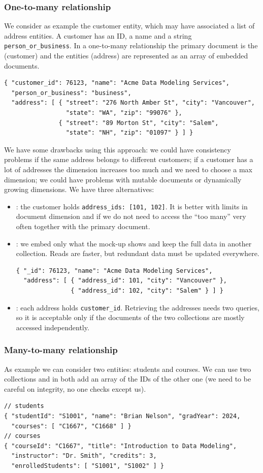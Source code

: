 \subsubsection{One-to-many relationship}
We consider as example the customer entity, which may have associated a list of address entities. A customer has an ID, a name and a string \texttt{person\_or\_business}. In a one-to-many relationship the primary document is the  (customer) and the  entities (address) are represented as an array of embedded documents.
\begin{lstlisting}
{ "customer_id": 76123, "name": "Acme Data Modeling Services",
  "person_or_business": "business",
  "address": [ { "street": "276 North Amber St", "city": "Vancouver",
                 "state": "WA", "zip": "99076" },
               { "street": "89 Morton St", "city": "Salem",
                 "state": "NH", "zip": "01097" } ] }
\end{lstlisting}
We have some drawbacks using this approach: we could have consistency problems if the same address belongs to different customers; if a customer has a lot of addresses the dimension increases too much and we need to choose a max dimension; we could have problems with mutable documents or dynamically growing dimensions. We have three alternatives:
\begin{itemize}
  \item {}: the customer holds \texttt{address\_ids: [101, 102]}. It is better with limits in document dimension and if we do not need to access the ``too many'' very often together with the primary document.
  \item {}: we embed only what the mock-up shows and keep the full data in another collection. Reads are faster, but redundant data must be updated everywhere.
\begin{lstlisting}
{ "_id": 76123, "name": "Acme Data Modeling Services",
  "address": [ { "address_id": 101, "city": "Vancouver" },
               { "address_id": 102, "city": "Salem" } ] }
\end{lstlisting}
  \item {}: each address holds \texttt{customer\_id}. Retrieving the addresses needs two queries, so it is acceptable only if the documents of the two collections are mostly accessed independently.
\end{itemize}

\subsubsection{Many-to-many relationship}
As example we can consider two entities: students and courses. We can use two collections and in both add an array of the IDs of the other one (we need to be careful on integrity, no one checks except us).
\begin{lstlisting}
// students
{ "studentId": "S1001", "name": "Brian Nelson", "gradYear": 2024,
  "courses": [ "C1667", "C1668" ] }
// courses
{ "courseId": "C1667", "title": "Introduction to Data Modeling",
  "instructor": "Dr. Smith", "credits": 3,
  "enrolledStudents": [ "S1001", "S1002" ] }
\end{lstlisting}

